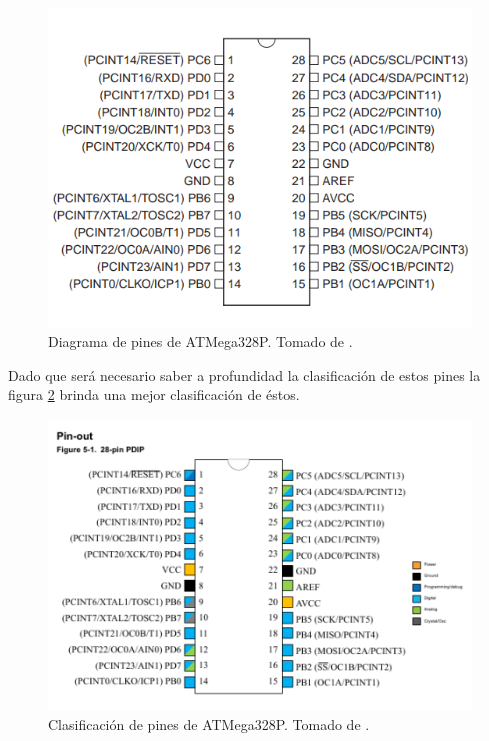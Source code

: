 \begin{figure}[H]
\centering
\includegraphics[width=.8\linewidth]{Imagenes/2.png}
 \caption{Diagrama de pines de ATMega328P. Tomado de \cite{web}.}
 \label{fig2}
\end{figure}
Dado que será necesario saber a profundidad la clasificación de estos pines la figura \ref{fig2.1} brinda una mejor clasificación de éstos.
\begin{figure}[H]
\centering
\includegraphics[width=.8\linewidth]{Imagenes/2.1.png}
 \caption{Clasificación de pines de ATMega328P. Tomado de \cite{web}.}
 \label{fig2.1}
\end{figure}

